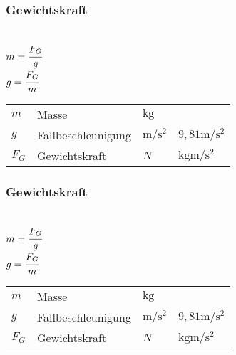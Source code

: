 \documentclass[a4paper, 10pt]{article}
\begin{document}
\subsubsection{Gewichtskraft}
\begin{minipage}{0.45\textwidth}

 \\
$m = \cfrac{F_G}{g}$ \\
$g = \cfrac{F_G}{m}$

\end{minipage}
\begin{minipage}{0.45\textwidth}

\begin{tabular}{llll}
$m$ & Masse & $\si{\kilo\gram}$ & \\
$g$ & Fallbeschleunigung & $\si{\metre\per\square\second}$ & $9,81 \si{\metre\per\square\second}$ \\
$F_G$ & Gewichtskraft & $N$ & $\si{\kilogram\metre\per\square\second}$ \\
\end{tabular}

\end{minipage}

\subsubsection{Gewichtskraft}
\begin{minipage}{0.45\textwidth}

 \\
$m = \cfrac{F_G}{g}$ \\
$g = \cfrac{F_G}{m}$

\end{minipage}
\begin{minipage}{0.45\textwidth}

\begin{tabular}{llll}
$m$ & Masse & $\si{\kilo\gram}$ & \\
$g$ & Fallbeschleunigung & $\si{\metre\per\square\second}$ & $9,81 \si{\metre\per\square\second}$ \\
$F_G$ & Gewichtskraft & $N$ & $\si{\kilogram\metre\per\square\second}$ \\
\end{tabular}

\end{minipage}
\end{document}
